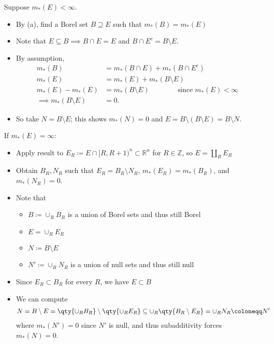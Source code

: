 \begin{solution}
Suppose \(m_*(E) < \infty\).

\begin{itemize}
\tightlist
\item
  By (a), find a Borel set \(B\supseteq E\) such that
  \(m_*(B) = m_*(E)\)
\item
  Note that \(E\subseteq B \implies B\cap E = E\) and
  \(B\cap E^c = B\setminus E\).
\item
  By assumption,
  \begin{align*}
  m_*(B) &= m_*(B\cap E) + m_*(B\cap E^c) \\
  m_*(E) &= m_*(E) + m_*(B\setminus E) \\ 
  m_*(E) - m_*(E) &= m_*(B\setminus E) \qquad\qquad\text{since } m_*(E) < \infty \\ 
  \implies m_*(B\setminus E) &= 0
  .\end{align*}
\item
  So take \(N = B\setminus E\); this shows \(m_*(N) = 0\) and
  \(E = B\setminus (B\setminus E) = B\setminus N\).
\end{itemize}

If \(m_*(E) = \infty\):

\begin{itemize}
\tightlist
\item
  Apply result to
  \(E_R\coloneqq E \cap[R, R+1)^n \subset {\mathbb{R}}^n\) for
  \(R\in {\mathbb{Z}}\), so \(E = {\coprod}_R E_R\)
\item
  Obtain \(B_R, N_R\) such that \(E_R = B_R \setminus N_R\),
  \(m_*(E_R) = m_*(B_R)\), and \(m_*(N_R) = 0\).
\item
  Note that

  \begin{itemize}
  \tightlist
  \item
    \(B\coloneqq\cup_R B_R\) is a union of Borel sets and thus still
    Borel
  \item
    \(E = \cup_R E_R\)
  \item
    \(N\coloneqq B\setminus E\)
  \item
    \(N' \coloneqq\cup_R N_R\) is a union of null sets and thus still
    null
  \end{itemize}
\item
  Since \(E_R \subset B_R\) for every \(R\), we have \(E\subset B\)
\item
  We can compute
  \begin{align*}
  N = B\setminus E = \qty{ \cup_R B_R } \setminus \qty{\cup_R E_R } \subseteq \cup_R \qty{B_R\setminus E_R} = \cup_R N_R \coloneqq N'
  \end{align*}
  where \(m_*(N') = 0\) since \(N'\) is null, and thus subadditivity
  forces \(m_*(N) = 0\).
\end{itemize}

\end{solution}

